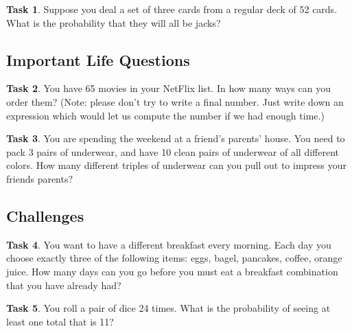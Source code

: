 \documentclass[12pt,letterpaper]{article}
\theoremstyle{definition}
\newtheorem{task}{Task}
\begin{document}
\begin{task}Suppose you deal a set of three cards from a regular deck of 52 cards. What is the probability that they will all be jacks?
\end{task}

\subsection*{Important Life Questions}

\begin{task}You have 65 movies in your NetFlix list. In how many ways can you order them? (Note: please don't try to write a final number. Just write down an expression which would let us compute the number if we had enough time.)
\end{task}

\begin{task}
You are spending the weekend at a friend's parents' house. You need to pack 3 pairs of underwear, and have 10 clean pairs of underwear of 
all different colors. How many different triples of underwear can you pull out to impress your friends parents?
\end{task}

\subsection*{Challenges}

\begin{task}You want to have a different breakfast every morning. Each day you choose exactly three of the following items: eggs, 
bagel, pancakes, coffee, orange juice. How many days can you go before you must eat a breakfast combination that you have already had?
\end{task}

\begin{task}
You roll a pair of dice 24 times. What is the probability of seeing at least one total that is 11?
\end{task}
\end{document}
